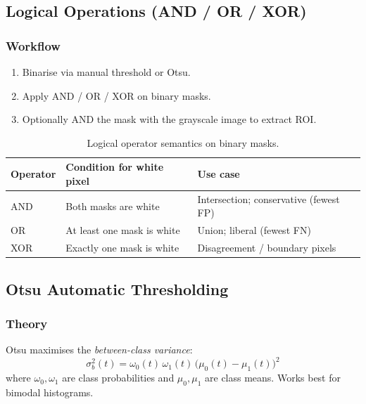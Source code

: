 \documentclass[12pt,a4paper]{article}
\begin{document}
\subsection{Logical Operations (AND / OR / XOR)}

\subsubsection*{Workflow}
\begin{enumerate}
  \item Binarise via manual threshold or Otsu.
  \item Apply AND / OR / XOR on binary masks.
  \item Optionally AND the mask with the grayscale image to extract ROI.
\end{enumerate}

\begin{table}[H]
  \centering
  \begin{tabular}{@{}lll@{}}
    \toprule
    Operator & Condition for white pixel & Use case \\
    \midrule
    AND & Both masks are white & Intersection; conservative (fewest FP) \\
    OR  & At least one mask is white & Union; liberal (fewest FN) \\
    XOR & Exactly one mask is white & Disagreement / boundary pixels \\
    \bottomrule
  \end{tabular}
  \caption{Logical operator semantics on binary masks.}
\end{table}

\subsection{Otsu Automatic Thresholding}

\subsubsection*{Theory}
Otsu maximises the \emph{between-class variance}:
\begin{equation}
  \sigma_b^2(t) = \omega_0(t)\,\omega_1(t)\,\bigl(\mu_0(t) - \mu_1(t)\bigr)^2
\end{equation}
where $\omega_0, \omega_1$ are class probabilities and $\mu_0, \mu_1$ are class means.
Works best for bimodal histograms.
\end{document}
